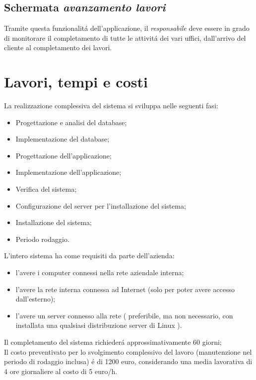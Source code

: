 \documentclass[paper=a4, fontsize=11pt]{scrartcl} %
\numberwithin{equation}{section} %
\numberwithin{figure}{section} %
\numberwithin{table}{section} %
\begin{document}
\subsection{Schermata \textit{avanzamento lavori}}

Tramite questa funzionalit\'a dell'applicazione, il \textit{responsabile}
deve essere in grado di monitorare il completamento di tutte le attivit\'a
dei vari uffici, dall'arrivo del cliente al completamento dei lavori.

\newpage
\section{Lavori, tempi e costi}

La realizzazione complessiva del sistema si sviluppa nelle seguenti fasi:
\begin{itemize}
\item Progettazione e analisi del database;
\item Implementazione del database;
\item Progettazione dell'applicazione;
\item Implementazione dell'applicazione;
\item Verifica del sistema;
\item Configurazione del server per l'installazione del sistema;
\item Installazione del sistema;
\item Periodo rodaggio.
\end{itemize}

L'intero sistema ha come requisiti da parte dell'azienda:
\begin{itemize}
\item l'avere i computer connessi nella rete aziendale interna;
\item l'avere la rete interna connessa ad Internet (solo per poter avere accesso dall'esterno);
\item l'avere un server connesso alla rete
( preferibile, ma non necessario, con installata una qualsiasi distribuzione server di Linux ).
\end{itemize}

Il completamento del sistema richieder\'a approssimativamente 60 giorni;\\
Il costo preventivato per lo svolgimento complessivo del lavoro (manutenzione nel periodo di rodaggio inclusa)
\'e di 1200 euro, considerando una media lavorativa di 4 ore giornaliere al costo di 5 euro/h.

\newpage
\end{document}
